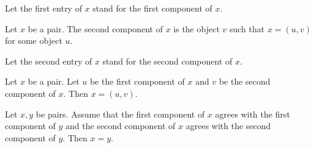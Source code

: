 \documentclass[../../set-theory.ftl.tex]{subfiles}
\begin{document}
\begin{forthel}
    Let the first entry of $x$ stand for the first component of $x$.

    \begin{definition}
      Let $x$ be a pair.
      The second component of $x$ is the object $v$ such that $x = (u,v)$ for some object $u$.
    \end{definition}

    Let the second entry of $x$ stand for the second component of $x$.

    \begin{lemma}\label{SetTheory_01_05_160632}
      Let $x$ be a pair.
      Let $u$ be the first component of $x$ and $v$ be the second component of $x$.
      Then $x = (u,v)$.
    \end{lemma}

    \begin{lemma}\label{SetTheory_01_05_204699}
      Let $x,y$ be pairs.
      Assume that the first component of $x$ agrees with the first component of $y$ and the second component of $x$ agrees with the second component of $y$.
      Then $x = y$.
    \end{lemma}
  \end{forthel}
\end{document}
